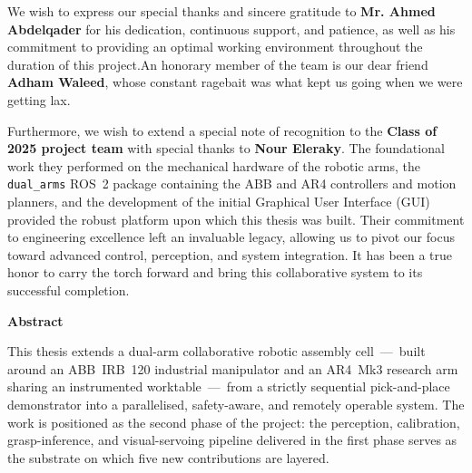 \documentclass[11pt,a4paper,twoside]{report}
\begin{document}
We wish to express our special thanks and sincere gratitude to \textbf{Mr. Ahmed Abdelqader} for his dedication, continuous support, and patience, as well as his commitment to providing an optimal working environment throughout the duration of this project.An honorary member of the team is our dear friend \textbf{Adham Waleed}, whose constant ragebait was what kept us going when we were getting lax.

Furthermore, we wish to extend a special note of recognition to the \textbf{Class of 2025 project team} with special thanks to \textbf{Nour Eleraky}. The foundational work they performed on the mechanical hardware of the robotic arms, the \texttt{dual\_arms} ROS~2 package containing the ABB and AR4 controllers and motion planners, and the development of the initial Graphical User Interface (GUI) provided the robust platform upon which this thesis was built. Their commitment to engineering excellence left an invaluable legacy, allowing us to pivot our focus toward advanced control, perception, and system integration. It has been a true honor to carry the torch forward and bring this collaborative system to its successful completion.
\clearpage

\vspace*{-2cm} %
\thispagestyle{footeronly}
\begin{center}
    {\Large \textbf{Abstract}} %
\end{center}

\vspace{1cm} %

This thesis extends a dual-arm collaborative robotic assembly cell~—~built around an ABB~IRB~120 industrial manipulator and an AR4~Mk3 research arm sharing an instrumented worktable~—~from a strictly sequential pick-and-place demonstrator into a parallelised, safety-aware, and remotely operable system. The work is positioned as the second phase of the project: the perception, calibration, grasp-inference, and visual-servoing pipeline delivered in the first phase serves as the substrate on which five new contributions are layered.
\end{document}
